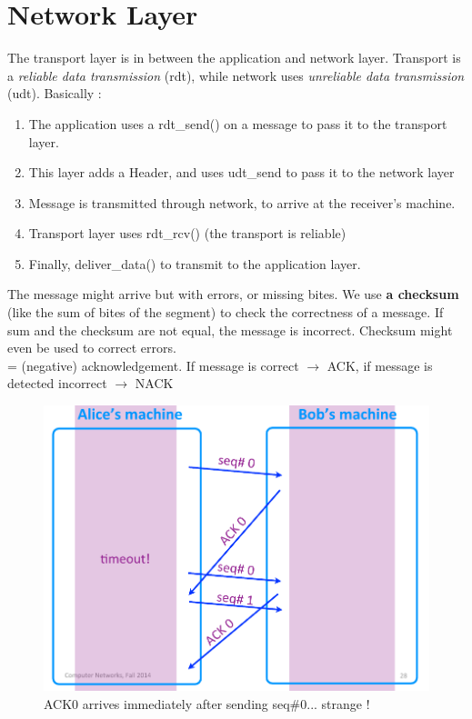 \documentclass[12pt,a4paper]{article}
\begin{document}
\section{Network Layer}
The transport layer is in between the application and network layer. Transport is a \textit{reliable data transmission} (rdt), while network uses \textit{unreliable data transmission} (udt). Basically :
\begin{enumerate}
	\item  	The application uses a rdt\_send() on a message to pass it to the transport layer.
	\item 	This layer adds a Header, and uses udt\_send to pass it to the network layer
	\item 	Message is transmitted through network, to arrive at the receiver's machine.
	\item 	Transport layer uses rdt\_rcv() (the transport is reliable)
	\item 	Finally, deliver\_data() to transmit to the application layer.
\end{enumerate} 
 The message might arrive but with errors, or missing bites. We use \textbf{a checksum} (like the sum of bites of the segment) to check the correctness of a message. If sum and the checksum are not equal, the message is incorrect. Checksum might even be used to correct errors.\\
 = (negative) acknowledgement. If message is correct $\to$ ACK, if message is detected incorrect $\to$ NACK

\begin{figure}[!h]
	\centering
	\includegraphics[scale=0.3]{images/suspicious_ack}
	\caption{ACK0 arrives immediately after sending seq\#0... strange !}
	\label{fig: ack timeout}
\end{figure}
\end{document}
